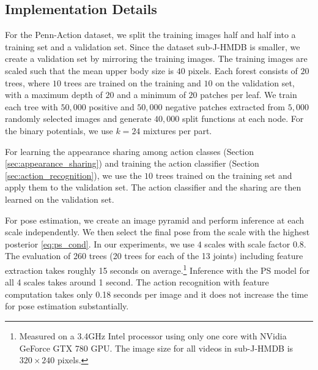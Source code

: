 \documentclass[a4paper, 10pt, conference]{ieeeconf}      \usepackage{FG2017}
\begin{document}
\subsection{Implementation Details}

For the Penn-Action dataset, we split the training images half and half into a training set and a validation set. Since the dataset sub-J-HMDB is smaller, we create a validation set by mirroring the training images. The training images are scaled such that the mean upper body size is $40$ pixels. Each forest consists of $20$ trees, where $10$ trees are trained on the training and $10$ on the validation set, with a maximum depth of $20$ and a minimum of $20$ patches per leaf. We train each tree with $50,000$ positive and $50,000$ negative patches extracted from $5,000$ randomly selected images and generate $40,000$ split functions at each node. 
For the binary potentials, we use $k=24$ mixtures per part. 

For learning the appearance sharing among action classes (Section \ref{sec:appearance_sharing}) and training the action classifier (Section \ref{sec:action_recognition}), we use the $10$ trees trained on the training set and apply them to the validation set. The action classifier and the sharing are then learned on the validation set.  

For pose estimation, we create an image pyramid and perform inference at each scale independently. We then select the final pose from the scale with the highest posterior \eqref{eq:ps_cond}. In our experiments, we use $4$ scales with scale factor $0.8$. 
The evaluation of 260 trees (20 trees for each of the 13 joints) including feature extraction takes roughly 15 seconds on average.\footnote{Measured on a 3.4GHz Intel processor using only one core with NVidia GeForce GTX 780 GPU. The image size for all videos in sub-J-HMDB is $320\times240$ pixels.} Inference with the PS model for all 4 scales takes around 1 second. The action recognition with feature computation takes only 0.18 seconds per image and it does not increase the time for pose estimation substantially. 
\end{document}

